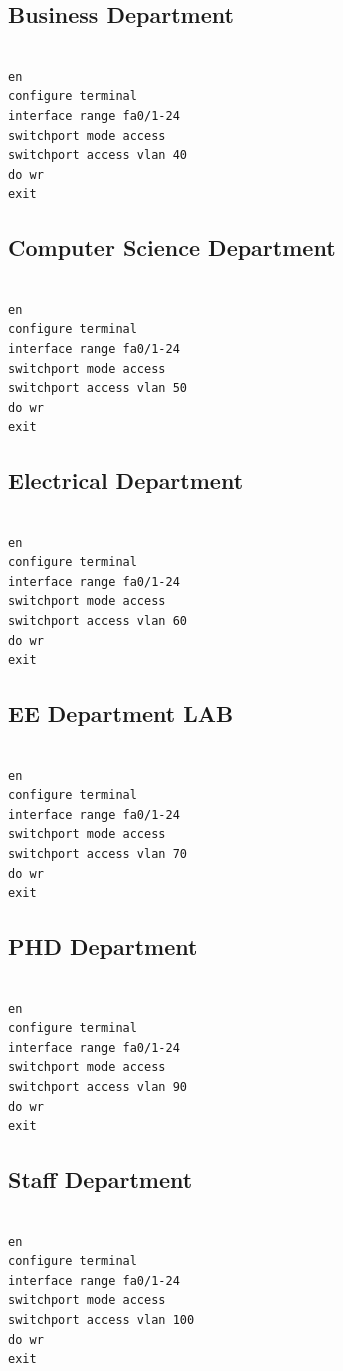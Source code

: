 \documentclass[12pt]{article}
\begin{document}
\subsection{Business Department}
\begin{verbatim}

en 
configure terminal
interface range fa0/1-24
switchport mode access
switchport access vlan 40
do wr
exit
\end{verbatim}

\subsection{Computer Science Department}
\begin{verbatim}

en 
configure terminal
interface range fa0/1-24
switchport mode access
switchport access vlan 50
do wr
exit
\end{verbatim}

\subsection{Electrical Department}
\begin{verbatim}

en 
configure terminal
interface range fa0/1-24
switchport mode access
switchport access vlan 60
do wr
exit
\end{verbatim}

\subsection{EE Department LAB}
\begin{verbatim}

en 
configure terminal
interface range fa0/1-24
switchport mode access
switchport access vlan 70
do wr
exit
\end{verbatim}

\subsection{PHD Department}
\begin{verbatim}

en 
configure terminal
interface range fa0/1-24
switchport mode access
switchport access vlan 90
do wr
exit
\end{verbatim}

\subsection{Staff Department}
\begin{verbatim}

en 
configure terminal
interface range fa0/1-24
switchport mode access
switchport access vlan 100
do wr
exit
\end{verbatim}
\end{document}
